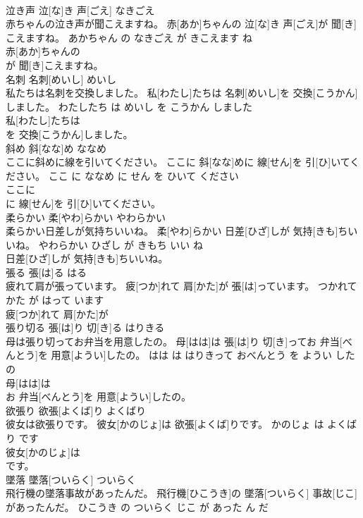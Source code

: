 \documentclass[8pt]{extreport}
\begin{document}
\begin{CJK}{UTF8}{min}
\\	泣き声	泣[な]き 声[ごえ]	なきごえ	
\\	赤ちゃんの泣き声が聞こえますね。	赤[あか]ちゃんの 泣[な]き 声[ごえ]が 聞[き]こえますね。	あかちゃん の なきごえ が きこえます ね	
\\	赤[あか]ちゃんの
\\	が 聞[き]こえますね。			
\\	名刺	名刺[めいし]	めいし	
\\	私たちは名刺を交換しました。	私[わたし]たちは 名刺[めいし]を 交換[こうかん]しました。	わたしたち は めいし を こうかん しました	
\\	私[わたし]たちは
\\	を 交換[こうかん]しました。			
\\	斜め	斜[なな]め	ななめ	
\\	ここに斜めに線を引いてください。	ここに 斜[なな]めに 線[せん]を 引[ひ]いてください。	ここ に ななめ に せん を ひいて ください	
\\	ここに
\\	に 線[せん]を 引[ひ]いてください。			
\\	柔らかい	柔[やわ]らかい	やわらかい	
\\	柔らかい日差しが気持ちいいね。	柔[やわ]らかい 日差[ひざ]しが 気持[きも]ちいいね。	やわらかい ひざし が きもち いい ね	
\\	日差[ひざ]しが 気持[きも]ちいいね。			
\\	張る	張[は]る	はる	
\\	疲れて肩が張っています。	疲[つか]れて 肩[かた]が 張[は]っています。	つかれて かた が はって います	
\\	疲[つか]れて 肩[かた]が
\\	張り切る	張[は]り 切[き]る	はりきる	
\\	母は張り切ってお弁当を用意したの。	母[はは]は 張[は]り 切[き]ってお 弁当[べんとう]を 用意[ようい]したの。	はは は はりきって おべんとう を ようい した の	
\\	母[はは]は
\\	お 弁当[べんとう]を 用意[ようい]したの。			
\\	欲張り	欲張[よくば]り	よくばり	
\\	彼女は欲張りです。	彼女[かのじょ]は 欲張[よくば]りです。	かのじょ は よくばり です	
\\	彼女[かのじょ]は
\\	です。			
\\	墜落	墜落[ついらく]	ついらく	
\\	飛行機の墜落事故があったんだ。	飛行機[ひこうき]の 墜落[ついらく] 事故[じこ]があったんだ。	ひこうき の ついらく じこ が あった ん だ	

\end{CJK}
\end{document}
